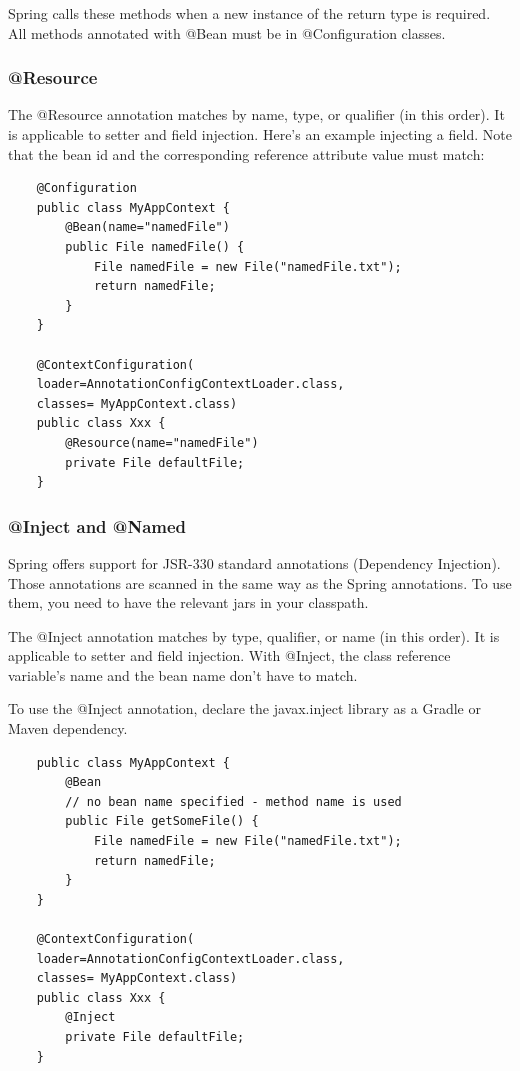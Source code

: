 \documentclass{scrartcl}
\begin{document}
    Spring calls these methods when a new instance of the return type is required. All methods annotated with @Bean must be in @Configuration classes.


\subsubsection{@Resource}

The @Resource annotation matches by name, type, or qualifier (in this order). It is applicable to setter and field injection.
Here’s an example injecting a field. Note that the bean id and the corresponding reference attribute value must match:

\begin{lstlisting}
    @Configuration
    public class MyAppContext {
        @Bean(name="namedFile")
        public File namedFile() {
            File namedFile = new File("namedFile.txt");
            return namedFile;
        }
    }

    @ContextConfiguration(
    loader=AnnotationConfigContextLoader.class,
    classes= MyAppContext.class)
    public class Xxx {
        @Resource(name="namedFile")
        private File defaultFile;
    }
\end{lstlisting}

\subsubsection{@Inject and @Named}

Spring offers support for JSR-330 standard annotations (Dependency Injection). Those annotations are scanned in the same way as the Spring annotations. To use them, you need to have the relevant jars in your classpath.

The @Inject annotation matches by type, qualifier, or name (in this order). It is applicable to setter and field injection. With @Inject, the class reference variable's name and the bean name don’t have to match.

To use the @Inject annotation, declare the javax.inject library as a Gradle or Maven dependency.

\begin{lstlisting}
    public class MyAppContext {
        @Bean
        // no bean name specified - method name is used
        public File getSomeFile() {
            File namedFile = new File("namedFile.txt");
            return namedFile;
        }
    }

    @ContextConfiguration(
    loader=AnnotationConfigContextLoader.class,
    classes= MyAppContext.class)
    public class Xxx {
        @Inject
        private File defaultFile;
    }
\end{lstlisting}
\end{document}
